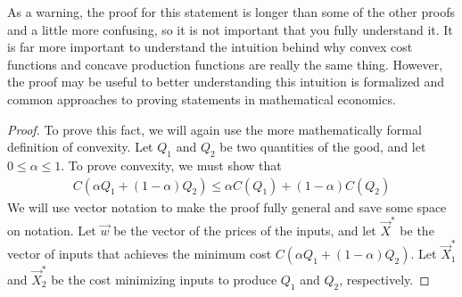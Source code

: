 \begin{description}
    As a warning, the proof for this statement is longer than some of the other proofs and a little more confusing, so it is not important that you fully understand it. It is far more important to understand the intuition behind why convex cost functions and concave production functions are really the same thing. However, the proof may be useful to better understanding this intuition is formalized and common approaches to proving statements in mathematical economics. 
    \begin{proof}
        To prove this fact, we will again use the more mathematically formal definition of convexity. Let $Q_1$ and $Q_2$ be two quantities of the good, and let $0 \leq \alpha \leq 1$. To prove convexity, we must show that 
        \begin{align*}
            C(\alpha Q_1 + (1 - \alpha) Q_2) \leq \alpha C(Q_1) + (1 - \alpha) C(Q_2)
        \end{align*}
        We will use vector notation to make the proof fully general and save some space on notation. Let $\vec{w}$ be the vector of the prices of the inputs, and let $\vec{X}^*$ be the vector of inputs that achieves the minimum cost $C(\alpha Q_1 + (1 - \alpha) Q_2)$. Let $\vec{X}_1^*$ and $\vec{X}_2^*$ be the cost minimizing inputs to produce $Q_1$ and $Q_2$, respectively. 


\end{proof}
\end{description}
